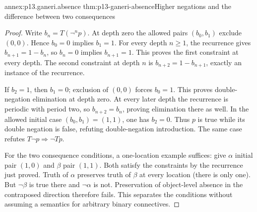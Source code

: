 \begin{annexitem}{annex:p13.ganeri.absence}
 {thm:p13-ganeri-absence}{Higher negations and the difference between two consequences}
\begin{proof}
Write \(b_n=T(\neg^np)\). At depth zero the allowed pairs
\((b_0,b_1)\) exclude \((0,0)\). Hence \(b_0=0\) implies \(b_1=1\).
For every depth \(n\geq1\), the recurrence gives
\(b_{n+1}=1-b_n\), so \(b_n=0\) implies \(b_{n+1}=1\).
This proves the first constraint at every depth.
The second constraint at depth \(n\) is
\(b_{n+2}=1-b_{n+1}\), exactly an instance of the recurrence.

If \(b_2=1\), then \(b_1=0\); exclusion of \((0,0)\) forces \(b_0=1\).
This proves double-negation elimination at depth zero.
At every later depth the recurrence is periodic with period two,
so \(b_{n+2}=b_n\), proving elimination there as well.
In the allowed initial case \((b_0,b_1)=(1,1)\), one has \(b_2=0\).
Thus \(p\) is true while its double negation is false, refuting
double-negation introduction. The same case refutes
\(T\neg p\Rightarrow\neg Tp\).

For the two consequence conditions, a one-location example suffices:
give \(\alpha\) initial pair \((1,0)\) and \(\beta\) pair \((1,1)\).
Both satisfy the constraints by the recurrence just proved.
Truth of \(\alpha\) preserves truth of \(\beta\) at every location
(there is only one). But \(\neg\beta\) is true there and
\(\neg\alpha\) is not. Preservation of object-level absence in the
contraposed direction therefore fails. This separates the conditions
without assuming a semantics for arbitrary binary connectives.
\end{proof}
\end{annexitem}

